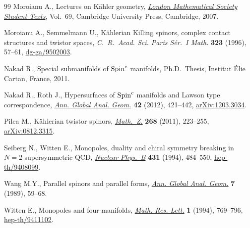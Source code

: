 \begin{thebibliography}{99}
Moroianu A., Lectures on {K}\"ahler geometry, \href{http://dx.doi.org/10.1017/CBO9780511618666}{\textit{London Mathematical
  Society Student Texts}}, Vol.~69, Cambridge University Press, Cambridge, 2007.

Moroianu A., Semmelmann U., K\"ahlerian {K}illing spinors, complex contact
  structures and twistor spaces, \textit{C.~R.~Acad. Sci. Paris S\'er.~I Math.}
  \textbf{323} (1996), 57--61, \href{http://arxiv.org/abs/dg-ga/9502003}{dg-ga/9502003}.

Nakad R., Special submanifolds of {${\rm Spin}^c$} manifolds, Ph.D.~Thesis,
  Institut \'Elie Cartan, France, 2011.

Nakad R., Roth J., Hypersurfaces of {${\rm Spin}^c$} manifolds and {L}awson
  type correspondence, \href{http://dx.doi.org/10.1007/s10455-012-9321-5}{\textit{Ann. Global Anal. Geom.}} \textbf{42} (2012),
  421--442, \href{http://arxiv.org/abs/1203.3034}{arXiv:1203.3034}.

Pilca M., K\"ahlerian twistor spinors, \href{http://dx.doi.org/10.1007/s00209-010-0668-7}{\textit{Math.~Z.}} \textbf{268} (2011),
  223--255, \href{http://arxiv.org/abs/0812.3315}{arXiv:0812.3315}.

Seiberg N., Witten E., Monopoles, duality and chiral symmetry breaking in
  {$N=2$} supersymmetric {QCD}, \href{http://dx.doi.org/10.1016/0550-3213(94)90214-3}{\textit{Nuclear Phys.~B}} \textbf{431} (1994),
  484--550, \href{http://arxiv.org/abs/hep-th/9408099}{hep-th/9408099}.

Wang M.Y., Parallel spinors and parallel forms, \href{http://dx.doi.org/10.1007/BF00137402}{\textit{Ann. Global Anal.
  Geom.}} \textbf{7} (1989), 59--68.

Witten E., Monopoles and four-manifolds, \href{http://dx.doi.org/10.4310/MRL.1994.v1.n6.a13}{\textit{Math. Res. Lett.}} \textbf{1}
  (1994), 769--796, \href{http://arxiv.org/abs/hep-th/9411102}{hep-th/9411102}.

\end{thebibliography}

